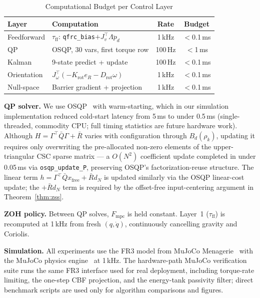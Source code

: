 \documentclass[journal]{IEEEtran}
\newcommand{\Fmpc}{F_{\text{mpc}}}
\begin{document}
\begin{table}[!t]
\caption{Computational Budget per Control Layer}
\label{tab:compute}
\renewcommand{\arraystretch}{1.0}
\centering
\setlength{\tabcolsep}{4pt}
\footnotesize
\begin{tabular}{@{}llcc@{}}
\toprule
\textbf{Layer} & \textbf{Computation} & \textbf{Rate} & \textbf{Budget}\\
\midrule
Feedforward & $\tau_{\text{ff}}$: \texttt{qfrc\_bias}$+J_v^\top\Lambda\ddot{p}_d$ & 1\,kHz & $<$0.1\,ms\\
QP          & OSQP, 30 vars, first torque row       & 100\,Hz  & $<$1\,ms\\
Kalman      & 9-state predict + update              & 100\,Hz  & $<$0.1\,ms\\
Orientation & $J_\omega^\top(-K_{\text{rot}}e_R-D_{\text{rot}}\omega)$ & 1\,kHz & $<$0.1\,ms\\
Null-space  & Barrier gradient + projection         & 1\,kHz   & $<$0.1\,ms\\
\bottomrule
\end{tabular}
\end{table}

\textbf{QP solver.}
We use OSQP~\cite{stellato2020osqp} with warm-starting, which in our
simulation implementation reduced cold-start latency from 5\,ms to under
0.5\,ms (single-threaded, commodity CPU; full timing statistics are future
hardware work).
Although $H=\Gamma^\top\bar{Q}\Gamma+\bar{R}$ varies with configuration
through $B_d(\rho_k)$, updating it requires only overwriting the
pre-allocated non-zero elements of the upper-triangular CSC sparse
matrix — a $O(N^2)$ coefficient update completed in under 0.05\,ms via
\texttt{osqp\_update\_P}, preserving OSQP's factorization-reuse
structure. The linear term
$h=\Gamma^\top\bar{Q}x_{\text{free}}+\bar R d_N$ is updated similarly
via the OSQP linear-cost update; the $+\bar R d_N$ term is required by
the offset-free input-centering argument in Theorem~\ref{thm:zss}.

\textbf{ZOH policy.}
Between QP solves, $\Fmpc$ is held constant.
Layer~1 ($\tau_{\text{ff}}$) is recomputed at 1\,kHz from fresh
$(q,\dot{q})$, continuously cancelling gravity and Coriolis.

\textbf{Simulation.}
All experiments use the FR3 model from MuJoCo
Menagerie~\cite{mujoco_menagerie} with the MuJoCo physics
engine~\cite{todorov2012mujoco} at 1\,kHz. The hardware-path MuJoCo
verification suite runs the same FR3 interface used for real deployment,
including torque-rate limiting, the one-step CBF projection, and the
energy-tank passivity filter; direct benchmark scripts are used only for
algorithm comparisons and figures.
\end{document}
